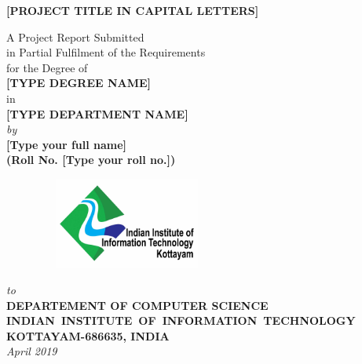 \documentclass[12pt,a4wide]{report}
\theoremstyle{plain}
\theoremstyle{definition}
\theoremstyle{remark}
\begin{document}

\begin{titlepage}
\enlargethispage{2cm}

\begin{center}

\vspace*{-1cm}

\textbf{\Large [PROJECT TITLE IN CAPITAL LETTERS]}\\[10pt]

\vspace*{2.5cm}


                         A Project Report Submitted \\
                     in Partial Fulfilment of the Requirements  \\
                     for the Degree of  \\
                          \vspace{4.5mm}
                   {\Large \bf [TYPE DEGREE NAME] } \\
                   in \\
                   {\large \bf [TYPE DEPARTMENT NAME] } \\

                      \vspace{9mm}
                   {\em  by} \\ \vspace{2.5mm}
             {\large \bf [Type your full name]} \\
{\large \bf (Roll No. [Type your roll no.])}\\[.35in]

\vfill

\begin{figure}[h]
  \begin{center}
  \includegraphics[width=6cm, height=3cm]{logo2.jpg}
  \end{center}
\end{figure}
\vspace*{0.22cm}

{\em\large to }\\%
{\bf\large DEPARTEMENT OF COMPUTER SCIENCE } \\%
{\bf\large \mbox{INDIAN INSTITUTE OF INFORMATION TECHNOLOGY }}\\%
{\bf\large KOTTAYAM-686635, INDIA}\\%
{\it\large April 2019}
\end{center}

\end{titlepage}
\end{document}
